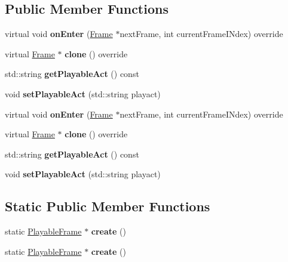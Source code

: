 \subsection*{Public Member Functions}
\begin{DoxyCompactItemize}
\item 
\mbox{\label{classPlayableFrame_aa471e401f93840667c07841149bb3d03}} 
virtual void {\bfseries on\+Enter} (\hyperlink{classFrame}{Frame} $\ast$next\+Frame, int current\+Frame\+I\+Ndex) override
\item 
\mbox{\label{classPlayableFrame_a8e4d3a3b68c810cca39196470a2002a4}} 
virtual \hyperlink{classFrame}{Frame} $\ast$ {\bfseries clone} () override
\item 
\mbox{\label{classPlayableFrame_aca6504d6e833d79c176277843440988f}} 
std\+::string {\bfseries get\+Playable\+Act} () const
\item 
\mbox{\label{classPlayableFrame_abedac4b751900b5f0e4ccce473e58d59}} 
void {\bfseries set\+Playable\+Act} (std\+::string playact)
\item 
\mbox{\label{classPlayableFrame_aeb4cd9f472cea3657456a4244be9baba}} 
virtual void {\bfseries on\+Enter} (\hyperlink{classFrame}{Frame} $\ast$next\+Frame, int current\+Frame\+I\+Ndex) override
\item 
\mbox{\label{classPlayableFrame_a25709992ce552e8f331cf99c87885401}} 
virtual \hyperlink{classFrame}{Frame} $\ast$ {\bfseries clone} () override
\item 
\mbox{\label{classPlayableFrame_aca6504d6e833d79c176277843440988f}} 
std\+::string {\bfseries get\+Playable\+Act} () const
\item 
\mbox{\label{classPlayableFrame_abedac4b751900b5f0e4ccce473e58d59}} 
void {\bfseries set\+Playable\+Act} (std\+::string playact)
\end{DoxyCompactItemize}
\subsection*{Static Public Member Functions}
\begin{DoxyCompactItemize}
\item 
\mbox{\label{classPlayableFrame_aa73edd1de2a2b7e679c8d2c362b9dd15}} 
static \hyperlink{classPlayableFrame}{Playable\+Frame} $\ast$ {\bfseries create} ()
\item 
\mbox{\label{classPlayableFrame_ae9ed5a9aabe4ceb4e438f8c53f9022e4}} 
static \hyperlink{classPlayableFrame}{Playable\+Frame} $\ast$ {\bfseries create} ()
\end{DoxyCompactItemize}
